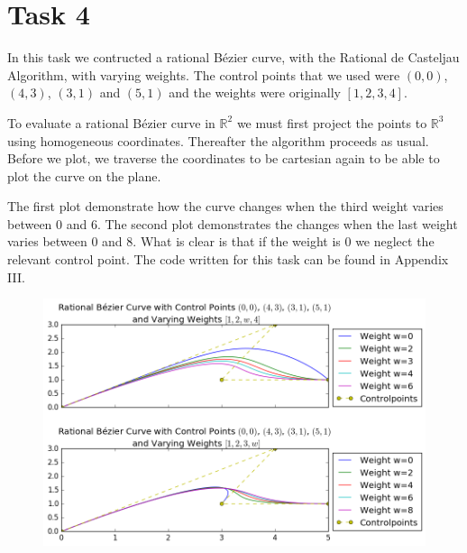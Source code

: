 \documentclass[]{article}
\begin{document}
\newpage
\section*{Task 4}
In this task we contructed a rational Bézier curve, with the Rational de Casteljau Algorithm, with varying weights. The control points that we used were $(0,0)$, $(4,3)$, $(3,1)$ and $(5,1)$ and the weights were originally $[1,2,3,4]$. 

To evaluate a rational Bézier curve in $\mathbb{R}^2$ we must first project the points to $\mathbb{R}^3$ using homogeneous coordinates. Thereafter the algorithm proceeds as usual. Before we plot, we traverse the coordinates to be cartesian again to be able to plot the curve on the plane. 

The first plot demonstrate how the curve changes when the third weight varies between $0$ and $6$. The second plot demonstrates the changes when the last weight varies between $0$ and $8$. What is clear is that if the weight is $0$ we neglect the relevant control point. The code written for this task can be found in Appendix III.

\begin{figure}[h!]
	\includegraphics[scale=0.5]{task4}
\end{figure}
\end{document}
